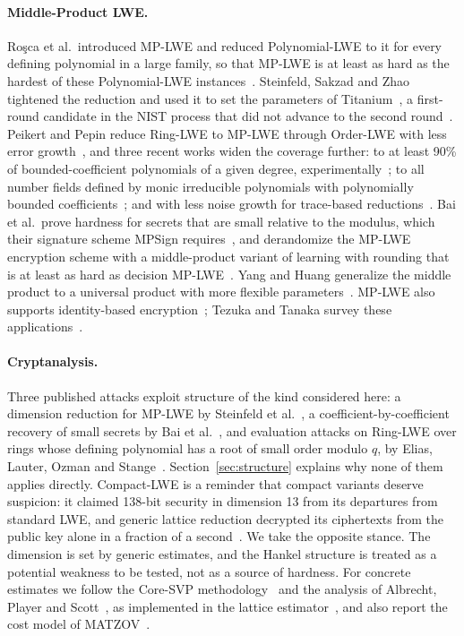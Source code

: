 \documentclass[11pt,a4paper]{article}
\theoremstyle{definition}
\begin{document}
\paragraph{Middle-Product LWE.} Ro\c{s}ca et al.\ introduced MP-LWE and reduced Polynomial-LWE to it for every defining polynomial in a large family, so that MP-LWE is at least as hard as the hardest of these Polynomial-LWE instances~\cite{rsss2017middle}. Steinfeld, Sakzad and Zhao tightened the reduction and used it to set the parameters of Titanium~\cite{ssz2019practical}, a first-round candidate in the NIST process that did not advance to the second round~\cite{nistir8240}. Peikert and Pepin reduce Ring-LWE to MP-LWE through Order-LWE with less error growth~\cite{peikert2019structured}, and three recent works widen the coverage further: to at least 90\% of bounded-coefficient polynomials of a given degree, experimentally~\cite{nchiwo2026improved}; to all number fields defined by monic irreducible polynomials with polynomially bounded coefficients~\cite{pelletmary2026unified}; and with less noise growth for trace-based reductions~\cite{cheng2026tighter}. Bai et al.\ prove hardness for secrets that are small relative to the modulus, which their signature scheme MPSign requires~\cite{bai2020mpsign}, and derandomize the MP-LWE encryption scheme with a middle-product variant of learning with rounding that is at least as hard as decision MP-LWE~\cite{bai2019mplwr}. Yang and Huang generalize the middle product to a universal product with more flexible parameters~\cite{yang2022universal}. MP-LWE also supports identity-based encryption~\cite{lvv2019trapdoors}; Tezuka and Tanaka survey these applications~\cite{tezuka2025survey}.

\paragraph{Cryptanalysis.} Three published attacks exploit structure of the kind considered here: a dimension reduction for MP-LWE by Steinfeld et al.~\cite{ssz2019practical}, a coefficient-by-coefficient recovery of small secrets by Bai et al.~\cite{bai2020mpsign}, and evaluation attacks on Ring-LWE over rings whose defining polynomial has a root of small order modulo $q$, by Elias, Lauter, Ozman and Stange~\cite{elos2015weak}. Section~\ref{sec:structure} explains why none of them applies directly. Compact-LWE is a reminder that compact variants deserve suspicion: it claimed 138-bit security in dimension 13 from its departures from standard LWE, and generic lattice reduction decrypted its ciphertexts from the public key alone in a fraction of a second~\cite{bootle2018compact}. We take the opposite stance. The dimension is set by generic estimates, and the Hankel structure is treated as a potential weakness to be tested, not as a source of hardness. For concrete estimates we follow the Core-SVP methodology~\cite{adps2016newhope} and the analysis of Albrecht, Player and Scott~\cite{aps2015concrete}, as implemented in the lattice estimator~\cite{latticeestimator}, and also report the cost model of MATZOV~\cite{matzov2022}.
\end{document}
